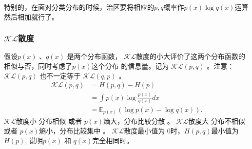 \documentclass[twocolumn]{article}
\begin{document}
    特别的，在面对分类分布的时候，治区要将相应的$ p,q $概率作$ p(x)\log q(x) $运算然后相加就行了。

\subsubsection{$ \mathcal{KL} $散度}
    假设$     p(x) $ 、$  q(x) $ 是两个分布函数， $ \mathcal{KL} $散度的小大评价了这两个分布函数的相似与否，同时考虑了$  p(x)  $这个分布
    的信息量。记为 $ \mathcal{KL}(p, q) $ 。注意：$  \mathcal{KL}(p, q) $ 也不一定等于 $ \mathcal{KL}(q,p) $ 。
\begin{equation}
    \begin{aligned}
        \mathcal{KL}(p, q) &= H(p,q) - H(p) \\
            &= \int p(x)\log \frac{p(x)}{q(x)} dx\\
            &= \mathbb{E}_{p(x)}(\log p(x) - \log q(x)).
    \end{aligned}
    \label{eq:005}
\end{equation}
    $ \mathcal{KL} $散度小 分布相似 或者 $ p(x) $熵大，分布比较分散 。
    $ \mathcal{KL} $散度大 分布不相似 或者 $ p(x) $熵小，分布比较集中 。
    $ \mathcal{KL} $散度最小值为 0时，$ H(p,q)  $最小值为$  H(p) $, 说明$  p(x) $ 和 $ q(x)  $完全相同时。
\end{document}
